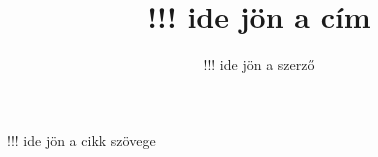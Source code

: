 \documentclass{article}
\title{!!! ide jön a cím}
\author{!!! ide jön a szerző}
\begin{document}
!!! ide jön a cikk szövege
\end{document}

